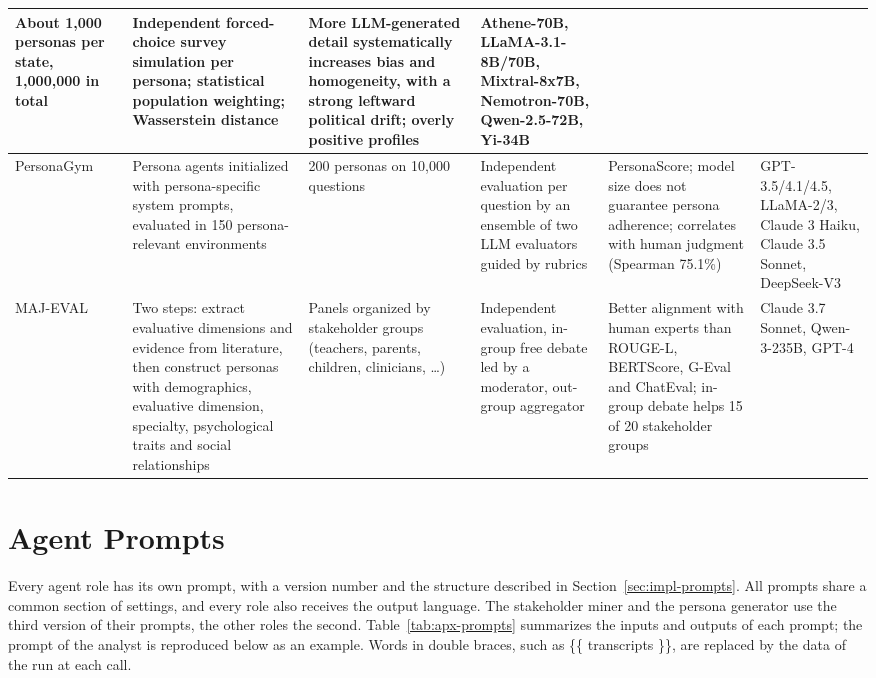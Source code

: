 \begin{appendices}
\begin{landscape}
\begin{longtable}{|p{2.2cm}|p{4.2cm}|p{2.8cm}|p{4.0cm}|p{5.0cm}|p{3.6cm}|}
    About 1{,}000 personas per state, 1{,}000{,}000 in total &
    Independent forced-choice survey simulation per persona; statistical population weighting; Wasserstein distance &
    More LLM-generated detail systematically increases bias and homogeneity, with a strong leftward political drift; overly positive profiles &
    Athene-70B, LLaMA-3.1-8B/70B, Mixtral-8x7B, Nemotron-70B, Qwen-2.5-72B, Yi-34B \\
    \hline
    PersonaGym~\cite{samuel2025personagym} &
    Persona agents initialized with persona-specific system prompts, evaluated in 150 persona-relevant environments &
    200 personas on 10{,}000 questions &
    Independent evaluation per question by an ensemble of two LLM evaluators guided by rubrics &
    PersonaScore; model size does not guarantee persona adherence; correlates with human judgment (Spearman 75.1\%) &
    GPT-3.5/4.1/4.5, LLaMA-2/3, Claude 3 Haiku, Claude 3.5 Sonnet, DeepSeek-V3 \\
    \hline
    MAJ-EVAL~\cite{chen2026majeval} &
    Two steps: extract evaluative dimensions and evidence from literature, then construct personas with demographics, evaluative dimension, specialty, psychological traits and social relationships &
    Panels organized by stakeholder groups (teachers, parents, children, clinicians, \ldots) &
    Independent evaluation, in-group free debate led by a moderator, out-group aggregator &
    Better alignment with human experts than ROUGE-L, BERTScore, G-Eval and ChatEval; in-group debate helps 15 of 20 stakeholder groups &
    Claude 3.7 Sonnet, Qwen-3-235B, GPT-4 \\
    \hline
\end{longtable}
\end{landscape}

\chapter{Agent Prompts}
\label{apx:prompts}
Every agent role has its own prompt, with a version number and the structure described in Section~\ref{sec:impl-prompts}. All prompts share a common section of settings, and every role also receives the output language. The stakeholder miner and the persona generator use the third version of their prompts, the other roles the second. Table~\ref{tab:apx-prompts} summarizes the inputs and outputs of each prompt; the prompt of the analyst is reproduced below as an example. Words in double braces, such as \{\{ transcripts \}\}, are replaced by the data of the run at each call.


\end{appendices}

